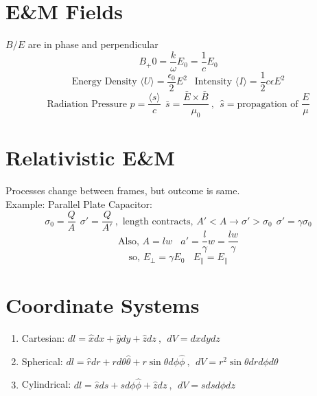 \documentclass[10pt,a4paper]{article}
\begin{document}
\section{E\&M Fields} %
\label{sec:e&m_fields}
$B/E$ are in phase and perpendicular
\begin{equation}
    B_+0 = \frac{k}{\omega}E_0 = \frac{1}{c}E_0
\end{equation}
\begin{equation}
    \textrm{Energy Density } \langle U \rangle = \frac{\epsilon_0}{2}E^2~~ \textrm{ Intensity }\langle I \rangle = \frac{1}{2}c\epsilon E^2
\end{equation}
\begin{equation}
    \textrm{Radiation Pressure } p = \frac{\langle s \rangle}{c}~~ \bar{s} = \frac{\bar{E} \times \bar{B}}{\mu_0}~,~~\hat{s} = \textrm{propagation of } \frac{E}{\mu}
\end{equation}

\section{Relativistic E\&M} %
\label{sec:relativistic_e&m}
Processes change between frames, but outcome is same. \\
Example: Parallel Plate Capacitor:
\begin{equation}
    \sigma_0 = \frac{Q}{A}~~ \sigma' = \frac{Q}{A'}~, \textrm{ length contracts, }A' < A \rightarrow \sigma'
 > \sigma_0~~ \sigma' = \gamma \sigma_0
\end{equation}
\begin{equation}
    \textrm{Also, }A = lw~~~~a' = \frac{l}{\gamma}w = \frac{lw}{\gamma}
\end{equation}
\begin{equation}
    \textrm{so, }E_\perp = \gamma E_0 ~~~~ E_\parallel = E_\parallel
\end{equation}

\section{Coordinate Systems} %
\label{sec:coordinate_systems}
\begin{enumerate}
    \item Cartesian: $dl = \hat{x} dx + \hat{y} dy + \hat{z}dz~,~~dV = dxdydz$
    \item Spherical: $dl = \hat{r}dr + rd\theta \hat{\theta} + r\sin \theta d\phi \hat{\phi}~,~~dV = r^2 \sin \theta dr d\phi d\theta$
    \item Cylindrical: $dl = \hat{s} ds  +sd\phi \hat{\phi} + \hat{z}dz ~,~~ dV = sdsd\phi dz$
\end{enumerate}
\end{document}
